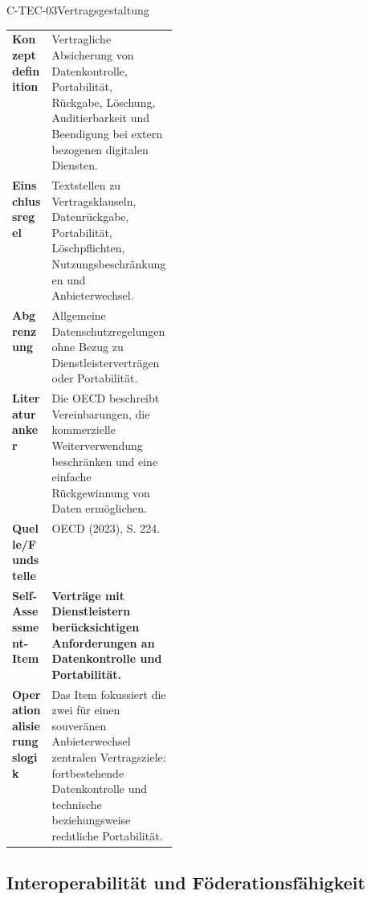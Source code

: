 \documentclass[10pt,a4paper]{article}
\begin{document}
\begin{codecard}{C-TEC-03}{Vertragsgestaltung}
\begin{tabularx}{\linewidth}{@{}>{\RaggedRight\arraybackslash\bfseries\color{DeepNavy}}p{0.245\linewidth}>{\RaggedRight\arraybackslash}X@{}}
Konzeptdefinition & Vertragliche Absicherung von Datenkontrolle, Portabilität, Rückgabe, Löschung, Auditierbarkeit und Beendigung bei extern bezogenen digitalen Diensten. \\
\arrayrulecolor{SoftRule}\hline
Einschlussregel & Textstellen zu Vertragsklauseln, Datenrückgabe, Portabilität, Löschpflichten, Nutzungsbeschränkungen und Anbieterwechsel. \\
\arrayrulecolor{SoftRule}\hline
Abgrenzung & Allgemeine Datenschutzregelungen ohne Bezug zu Dienstleisterverträgen oder Portabilität. \\
\arrayrulecolor{SoftRule}\hline
Literaturanker & Die OECD beschreibt Vereinbarungen, die kommerzielle Weiterverwendung beschränken und eine einfache Rückgewinnung von Daten ermöglichen. \\
\arrayrulecolor{SoftRule}\hline
Quelle/Fundstelle & OECD (2023), S. 224. \\
\arrayrulecolor{SoftRule}\hline
Self-Assessment-Item & \textbf{Verträge mit Dienstleistern berücksichtigen Anforderungen an Datenkontrolle und Portabilität.} \\
\arrayrulecolor{SoftRule}\hline
Operationalisierungslogik & Das Item fokussiert die zwei für einen souveränen Anbieterwechsel zentralen Vertragsziele: fortbestehende Datenkontrolle und technische beziehungsweise rechtliche Portabilität. \\
\end{tabularx}
\end{codecard}

\subsection{Interoperabilität und Föderationsfähigkeit}
\label{supp:dimension-4}
\end{document}
